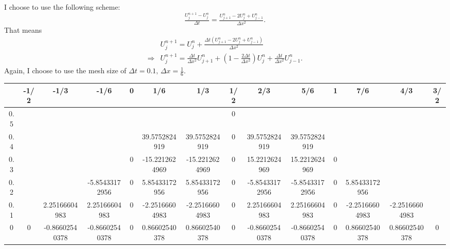 \begin{answer}
    I choose to use the following scheme:
    \begin{equation}
        \tfrac{U_j^{n+1} - U_j^n}{\Delta t} = \tfrac{U_{j+1}^n - 2U_j^n + U_{j-1}^n}{\Delta x^2}.
    \end{equation}
    That means
    \begin{equation}
        \begin{aligned}
            &U_j^{n+1} = U_j^n+\tfrac{\Delta t(U_{j+1}^n - 2U_j^n + U_{j-1}^n)}{\Delta x^2}\\
            \Rightarrow &U_j^{n+1} = \tfrac{\Delta t}{\Delta x^2}U_{j+1}^n + (1-\tfrac{2\Delta t}{\Delta x^2})U_j^n + \tfrac{\Delta t}{\Delta x^2}U_{j-1}^n.
        \end{aligned}
    \end{equation}
    Again, I choose to use the mesh size of $\Delta t = 0.1, \, \Delta x = \tfrac{1}{6}$. 
    \begin{table}[H]
\centering
\begin{adjustbox}{width=\columnwidth,center}
\begin{tabular}{|c|c|c|c|c|c|c|c|c|c|c|c|c|c|}
\hline
\textbf{} & -1/2 & -1/3           & -1/6           & 0 & 1/6            & 1/3            & 1/2 & 2/3            & 5/6            & 1 & 7/6            & 4/3            & 3/2 \\ \hline
0.5       &      &                &                &   &                &                & 0   &                &                &   &                &                &     \\ \hline
0.4       &      &                &                &   & 39.5752824919  & 39.5752824919  & 0   & 39.5752824919  & 39.5752824919  &   &                &                &     \\ \hline
0.3       &      &                &                & 0 & -15.2212624969 & -15.2212624969 & 0   & 15.2212624969  & 15.2212624969  & 0 &                &                &     \\ \hline
0.2       &      &                & -5.85433172956 & 0 & 5.85433172956  & 5.85433172956  & 0   & -5.85433172956 & -5.85433172956 & 0 & 5.85433172956  &                &     \\ \hline
0.1       &      & 2.25166604983  & 2.25166604983  & 0 & -2.25166604983 & -2.25166604983 & 0   & 2.25166604983  & 2.25166604983  & 0 & -2.25166604983 & -2.25166604983 &     \\ \hline
0         & 0    & -0.86602540378 & -0.86602540378 & 0 & 0.86602540378  & 0.86602540378  & 0   & -0.86602540378 & -0.86602540378 & 0 & 0.86602540378  & 0.86602540378  & 0   \\ \hline

\end{tabular}
\end{adjustbox}
\end{table}
\end{answer}

